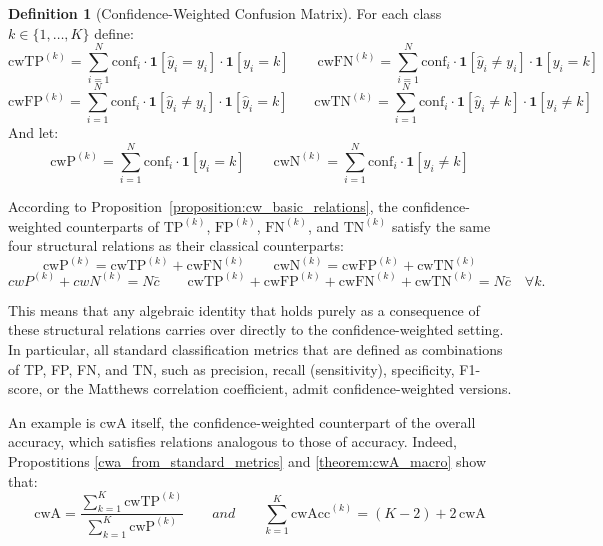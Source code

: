 \documentclass{article}
\theoremstyle{plain}
\theoremstyle{definition}
\newtheorem{definition}{Definition}
\theoremstyle{remark}
\begin{document}
\begin{definition}[Confidence-Weighted Confusion Matrix] \label{definition:cw_CM}
For each class $k \in \{1, \ldots, K\}$ define: 
\[
\text{cwTP}^{(k)} = \sum_{i=1}^N \text{conf}_i \cdot \mathbf{1}[\hat{y}_i = y_i] \cdot \mathbf{1}[y_i = k] \,\,\,\,\,\,\,\,\,\,\,\,  \text{cwFN}^{(k)} = \sum_{i=1}^N \text{conf}_i \cdot \mathbf{1}[\hat{y}_i \neq y_i] \cdot \mathbf{1}[y_i = k] 
\]\[
\text{cwFP}^{(k)} = \sum_{i=1}^N \text{conf}_i \cdot \mathbf{1}[\hat{y}_i \neq y_i] \cdot \mathbf{1}[\hat{y}_i = k] \,\,\,\,\,\,\,\,\,\,\,
\text{cwTN}^{(k)} = \sum_{i=1}^N \text{conf}_i \cdot \mathbf{1}[\hat{y}_i \neq k] \cdot \mathbf{1}[y_i \neq k] \]
And let: \[
\text{cwP}^{(k)} = \sum_{i=1}^N \text{conf}_i \cdot \mathbf{1}[y_i = k]   \,\,\,\,\,\,\,\,\,\,\,\, \text{cwN}^{(k)} = \sum_{i=1}^N \text{conf}_i \cdot \mathbf{1}[y_i \neq k]
\]
\end{definition}

According to Proposition~\ref{proposition:cw_basic_relations}, the confidence-weighted counterparts of $\text{TP}^{(k)}$, $\text{FP}^{(k)}$, $\text{FN}^{(k)}$, and $\text{TN}^{(k)}$ satisfy the same four structural relations as their classical counterparts:  \[
\text{cwP}^{(k)} = \text{cwTP}^{(k)} + \text{cwFN}^{(k)} \quad \quad \text{cwN}^{(k)} = \text{cwFP}^{(k)} + \text{cwTN}^{(k)}
\]   \[
cwP^{(k)} + cwN^{(k)} = N\bar{c}    \quad \quad   \text{cwTP}^{(k)} + \text{cwFP}^{(k)} + \text{cwFN}^{(k)} + \text{cwTN}^{(k)} = N\bar c \quad \forall k.
\] 

This means that any algebraic identity that holds purely as a consequence of these structural relations carries over directly to the confidence-weighted setting. In particular, all standard classification metrics that are defined as combinations of TP, FP, FN, and TN, such as precision, recall (sensitivity), specificity, F1-score, or the Matthews correlation coefficient, admit confidence-weighted versions.  

An example is cwA itself, the confidence-weighted counterpart of the overall accuracy, which satisfies relations analogous to those of accuracy. Indeed, Propostitions \ref{cwa_from_standard_metrics} and \ref{theorem:cwA_macro} show that:
\[
\text{cwA} = \frac{\sum_{k=1}^K \text{cwTP}^{(k)}}{\sum_{k=1}^K \text{cwP}^{(k)}} \quad \quad and \quad \quad \sum_{k=1}^K \text{cwAcc}^{(k)} = (K-2) + 2\,\text{cwA}
\]
\end{document}
